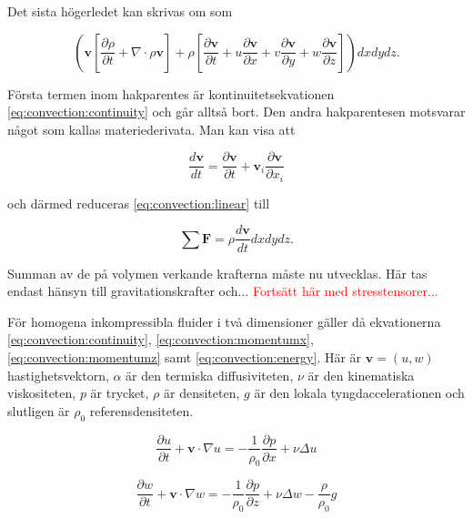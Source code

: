 Det sista högerledet kan skrivas om som

\begin{equation}
\left( \mathbf{v}\left[ \frac{\partial \rho}{\partial t} + \nabla\cdot \rho \mathbf{v}\right] + \rho\left[ \frac{\partial \mathbf{v}}{\partial t} + u\frac{\partial\mathbf{v}}{\partial x} + v\frac{\partial\mathbf{v}}{\partial y} + w\frac{\partial\mathbf{v}}{\partial z} \right]\right)dxdydz.
\end{equation}

Första termen inom hakparentes är kontinuitetsekvationen \eqref{eq:convection:continuity} och går alltså bort. Den andra hakparentesen motsvarar något som kallas materiederivata. Man kan visa att 

\begin{equation}
\label{eq:convection:material}
\frac{d\mathbf{v}}{dt} = \frac{\partial \mathbf{v}}{\partial t} + \mathbf{v}_i\frac{\partial \mathbf{v}}{\partial x_i}
\end{equation}

och därmed reduceras \eqref{eq:convection:linear} till

\begin{equation}
\label{eq:convection:linearfinal}
\sum \mathbf{F} = \rho \frac{d\mathbf{v}}{dt}dxdydz.
\end{equation}

Summan av de på volymen verkande krafterna måste nu utvecklas. Här tas endast hänsyn till gravitationskrafter och... \textcolor{red}{Fortsätt här med stresstensorer...}


För homogena inkompressibla fluider i två dimensioner gäller då ekvationerna
\eqref{eq:convection:continuity}, \eqref{eq:convection:momentumx},
\eqref{eq:convection:momentumz} samt \eqref{eq:convection:energy}. Här
är $\mathbf{v} = (u,w)$ hastighetsvektorn, $\alpha$ är den termiska
diffusiviteten, $\nu$ är den kinematiska viskositeten, $p$ är trycket,
$\rho$ är densiteten, $g$ är den lokala tyngdaccelerationen
och slutligen är $\rho_0$ referensdensiteten.

\begin{equation}
\label{eq:convection:momentumx}
\frac{\partial u}{\partial t} + \mathbf{v}\cdot\nabla u = 
-\frac{1}{\rho_0}\frac{\partial p}{\partial x} + 
\nu\Delta u
\end{equation}

\begin{equation}
\label{eq:convection:momentumz}
\frac{\partial w}{\partial t} + \mathbf{v}\cdot\nabla w = 
-\frac{1}{\rho_0}\frac{\partial p}{\partial z} + \nu\Delta w - \frac{\rho}{\rho_0}g
\end{equation}


